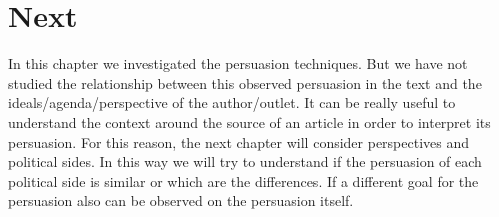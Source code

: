 

\section{\statusgreen Next}
In this chapter we investigated the persuasion techniques. But we have not studied the relationship between this observed persuasion in the text and the ideals/agenda/perspective of the author/outlet. It can be really useful to understand the context around the source of an article in order to interpret its persuasion.
For this reason, the next chapter will consider perspectives and political sides. In this way we will try to understand if the persuasion of each political side is similar or which are the differences. If a different goal for the persuasion also can be observed on the persuasion itself.